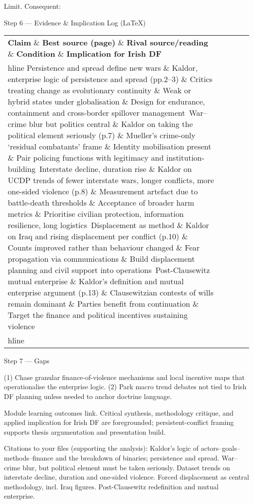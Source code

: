Limit. Consequent:

Step 6 — Evidence \& Implication Log (LaTeX)

 
\begin{tabular}{p{3.2cm}p{4.2cm}p{3.6cm}p{3.2cm}p{4.2cm}}
	\textbf{Claim} \& \textbf{Best source (page)} \& \textbf{Rival source/reading} \& \textbf{Condition} \& \textbf{Implication for Irish DF}\\hline
	Persistence and spread define new wars \& Kaldor, enterprise logic of persistence and spread (pp.2–3) \& Critics treating change as evolutionary continuity \& Weak or hybrid states under globalisation \& Design for endurance, containment and cross-border spillover management\
	War–crime blur but politics central \& Kaldor on taking the political element seriously (p.7) \& Mueller’s crime-only ‘residual combatants’ frame \& Identity mobilisation present \& Pair policing functions with legitimacy and institution-building\
	Interstate decline, duration rise \& Kaldor on UCDP trends of fewer interstate wars, longer conflicts, more one-sided violence (p.8) \& Measurement artefact due to battle-death thresholds \& Acceptance of broader harm metrics \& Prioritise civilian protection, information resilience, long logistics\
	Displacement as method \& Kaldor on Iraq and rising displacement per conflict (p.10) \& Counts improved rather than behaviour changed \& Fear propagation via communications \& Build displacement planning and civil support into operations\
	Post-Clausewitz mutual enterprise \& Kaldor’s definition and mutual enterprise argument (p.13) \& Clausewitzian contests of wills remain dominant \& Parties benefit from continuation \& Target the finance and political incentives sustaining violence\\hline
\end{tabular}

Step 7 — Gaps

(1) Chase granular finance-of-violence mechanisms and local incentive maps that operationalise the enterprise logic.
(2) Park macro trend debates not tied to Irish DF planning unless needed to anchor doctrine language.

Module learning outcomes link. Critical synthesis, methodology critique, and applied implication for Irish DF are foregrounded; persistent-conflict framing supports thesis argumentation and presentation build.

Citations to your files (supporting the analysis):
Kaldor’s logic of actors–goals–methods–finance and the breakdown of binaries; persistence and spread.
War–crime blur, but political element must be taken seriously.
Dataset trends on interstate decline, duration and one-sided violence.
Forced displacement as central methodology, incl. Iraq figures.
Post-Clausewitz redefinition and mutual enterprise.

